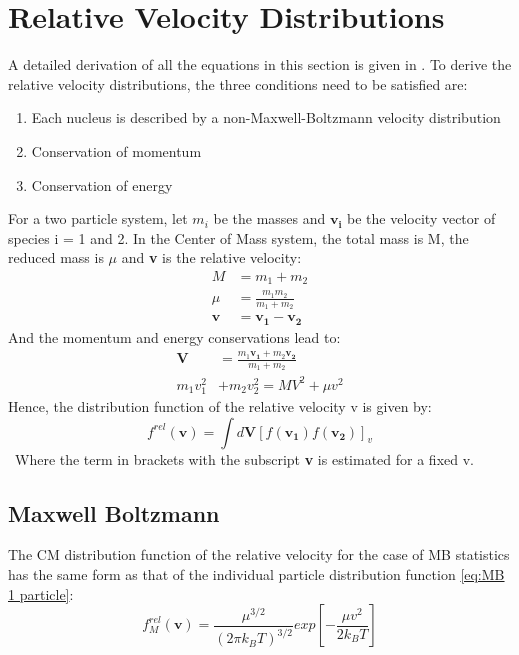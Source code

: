 \documentclass[11pt]{article}
\numberwithin{equation}{section}
\begin{document}
\pagebreak
\section{Relative Velocity Distributions}
A detailed derivation of all the equations in this section is given in \citep{Kusakabe:2018dzx}. To derive the relative velocity distributions, the three conditions need to be satisfied are:
\begin{enumerate}
	\item Each nucleus is described by a non-Maxwell-Boltzmann velocity distribution
	\item Conservation of momentum
	\item Conservation of energy
\end{enumerate}
For a two particle system, let $m_{i}$ be the masses and $\boldsymbol{v_{i}}$ be the velocity vector of species i = 1 and 2. In the Center of Mass system, the total mass is M, the reduced mass is $\mu$ and \textbf{v} is the relative velocity:
\begin{align}
	M&=m_{1}+m_{2} \nonumber \\
	\mu&=\frac{m_{1}m_{2}}{m_{1}+m_{2}}\\
	\boldsymbol{v}&=\boldsymbol{v_{1}}-\boldsymbol{v_{2}} \nonumber
\end{align}
And the momentum and energy conservations lead to:
\begin{align}
	\boldsymbol{V}&=\frac{m_{1}\boldsymbol{v_{1}}+m_{2}\boldsymbol{v_{2}}}{m_{1}+m_{2}}\\
	m_{1}v_{1}^{2}&+m_{2}v_{2}^{2}=MV^{2}+\mu v^{2}
\end{align}
Hence, the distribution function of the relative velocity v is given by:
$$f^{rel}(\boldsymbol{v})= \int d\boldsymbol{V}\left [ f(\boldsymbol {v_{1}})f(\boldsymbol{v_{2}}) \right ]_{v}$$\
Where the term in brackets with the subscript \textbf{v} is estimated for a fixed v.
\subsection{Maxwell Boltzmann}
The CM distribution function of the relative velocity for the case of MB statistics has the same form as that of the individual particle distribution function \eqref{eq:MB 1 particle}:
\begin{equation}
	f^{rel}_{M}(\boldsymbol{v})=\frac{\mu^{3/2}}{(2\pi k_{B}T)^{3/2}}exp\left [ -\frac{\mu v^2}{2k_B T} \right ]
\end{equation}
\end{document}
